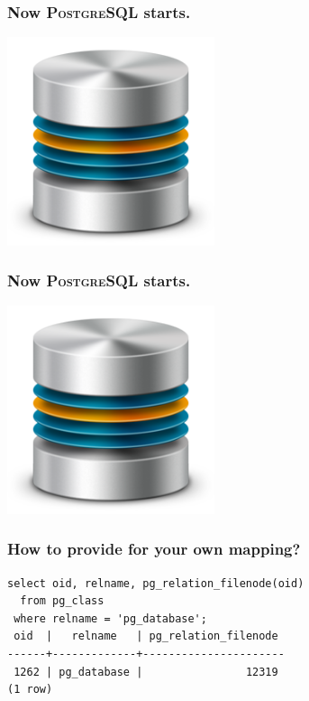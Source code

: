 \documentclass{beamer}
\begin{document}
\begin{frame}
  \frametitle{Now \textsc{PostgreSQL} starts.}

  \vfill
  
  \begin{center}
    \includegraphics[height=2.4in]{LRN-LNP-database.png}
  \end{center}
\end{frame}

\begin{frame}
  \frametitle{Now \textsc{PostgreSQL} starts.}

  \vfill
  
  \begin{center}
    \includegraphics[height=2.4in]{LRN-LNP-database.png}
  \end{center}
\end{frame}

\begin{frame}[fragile]
  \frametitle{How to provide for your own mapping?}

  \begin{verbatim}
select oid, relname, pg_relation_filenode(oid)
  from pg_class
 where relname = 'pg_database';
 oid  |   relname   | pg_relation_filenode 
------+-------------+----------------------
 1262 | pg_database |                12319
(1 row)
  \end{verbatim}  
\end{frame}
\end{document}
